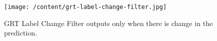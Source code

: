 \begin{figure}
	[h] \centering 
	\texttt{[image: /content/grt-label-change-filter.jpg]} \caption{GRT Label Change Filter outputs only when there is change in the prediction. \cite{16}} \label{fg:grt:label:change} 
\end{figure}
